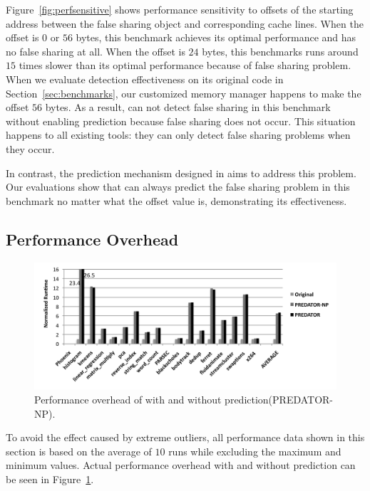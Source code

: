 Figure~\ref{fig:perfsensitive} shows performance sensitivity to 
offsets of the starting address between the false sharing object and corresponding cache lines. 
When the offset is $0$ or $56$ bytes, this benchmark achieves its optimal performance 
and has no false sharing at all.
When the offset is $24$ bytes, this benchmarks runs around $15$ times slower 
than its optimal performance because of false sharing problem.
When we evaluate detection effectiveness on its original code in Section~\ref{sec:benchmarks}, 
our customized memory manager happens to make the offset $56$ bytes. 
As a result, \Predator{} can not detect false sharing in this benchmark 
without enabling prediction because false sharing does not occur.
This situation happens to all existing tools: they can only detect false sharing problems when
they occur. 

In contrast, the prediction mechanism designed in \predator{} 
aims to address this problem. Our evaluations show 
that \Predator{} can always predict the false sharing problem in this
benchmark no matter what the offset value is, demonstrating its effectiveness.

\subsection{Performance Overhead}
\label{sec:perfoverhead}

\begin{figure}[ht]
\begin{center}
\includegraphics[width=6.5in]{fig/perf}
\end{center}
\caption{
Performance overhead of \Predator{} with and without prediction(PREDATOR-NP).
\label{fig:perf}}
\end{figure}

To avoid the effect caused by extreme outliers, all performance data shown in this section
is based on the average of $10$ runs while excluding the maximum and minimum values.
Actual performance overhead with and without prediction 
can be seen in Figure~\ref{fig:perf}. 

